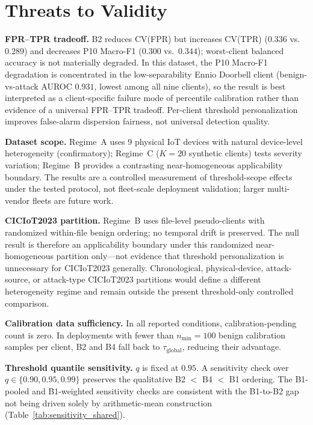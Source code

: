 \section{Threats to Validity}
\label{sec:threats}

\textbf{FPR--TPR tradeoff.}
B2 reduces CV(FPR) but increases CV(TPR) ($0.336$ vs.\ $0.289$) and decreases P10 Macro-F1
($0.300$ vs.\ $0.344$); worst-client balanced accuracy is not materially degraded.
In this dataset, the P10 Macro-F1 degradation is concentrated in the low-separability
Ennio Doorbell client (benign-vs-attack AUROC $0.931$, lowest among all nine clients),
so the result is best interpreted as a client-specific failure mode of percentile
calibration rather than evidence of a universal FPR--TPR tradeoff.
Per-client threshold personalization improves false-alarm dispersion fairness, not universal detection quality.

\textbf{Dataset scope.}
Regime~A uses 9 physical IoT devices with natural device-level heterogeneity
(confirmatory); Regime~C ($K{=}20$ synthetic clients) tests severity variation;
Regime~B provides a contrasting near-homogeneous applicability boundary.
The results are a controlled measurement of threshold-scope effects under the tested
protocol, not fleet-scale deployment validation; larger multi-vendor fleets are future work.

\textbf{CICIoT2023 partition.}
Regime~B uses file-level pseudo-clients with randomized within-file benign ordering;
no temporal drift is preserved.
The null result is therefore an applicability boundary under this randomized near-homogeneous
partition only---not evidence that threshold personalization is unnecessary for CICIoT2023
generally.
Chronological, physical-device, attack-source, or attack-type CICIoT2023 partitions would define a different heterogeneity regime and remain outside the present threshold-only controlled comparison.

\textbf{Calibration data sufficiency.}
In all reported conditions, calibration-pending count is zero.
In deployments with fewer than $n_{\min}=100$ benign calibration samples per client,
B2 and B4 fall back to $\tau_{\text{global}}$, reducing their advantage.

\textbf{Threshold quantile sensitivity.}
$q$ is fixed at $0.95$. A sensitivity check over $q \in \{0.90, 0.95, 0.99\}$
preserves the qualitative B2 $<$ B4 $<$ B1 ordering.
The B1-pooled and B1-weighted sensitivity checks are consistent with
the B1-to-B2 gap not being driven solely by arithmetic-mean construction (Table~\ref{tab:sensitivity_shared}).

